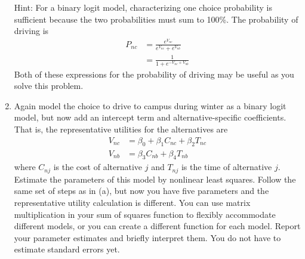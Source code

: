 \documentclass[11pt,letterpaper]{article}
\begin{document}
\begin{enumerate}[label=\alph*., leftmargin=*]
	Hint: For a binary logit model, characterizing one choice probability is sufficient because the two probabilities must sum to 100\%. The probability of driving is
	\begin{align*}
		P_{nc} &= \frac{e^{V_{nc}}}{e^{V_{nc}} + e^{V_{nb}}} \\
		&= \frac{1}{1 + e^{-V_{nc} + V_{nb}}}
	\end{align*}
	Both of these expressions for the probability of driving may be useful as you solve this problem.

	\item Again model the choice to drive to campus during winter as a binary logit model, but now add an intercept term and alternative-specific coefficients. That is, the representative utilities for the alternatives are
	\begin{align*}
		V_{nc} &= \beta_0 + \beta_1 C_{nc} + \beta_2 T_{nc} \\
		V_{nb} &= \beta_3 C_{nb} + \beta_4 T_{nb}
	\end{align*}
	where $C_{nj}$ is the cost of alternative $j$ and $T_{nj}$ is the time of alternative $j$. Estimate the parameters of this model by nonlinear least squares. Follow the same set of steps as in (a), but now you have five parameters and the representative utility calculation is different. You can use matrix multiplication in your sum of squares function to flexibly accommodate different models, or you can create a different function for each model. Report your parameter estimates and briefly interpret them. You do not have to estimate standard errors yet.


\end{enumerate}
\end{document}
